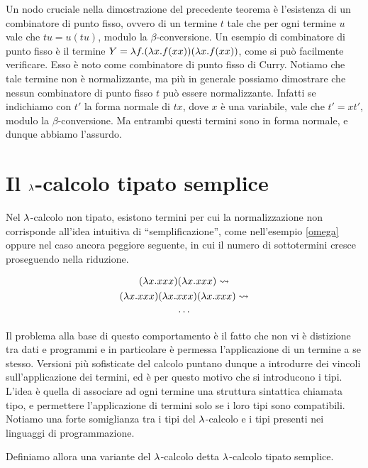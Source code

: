 \documentclass[]{marticle}
\begin{document}
Un nodo cruciale nella dimostrazione del precedente teorema \`e l'esistenza di
un combinatore di punto fisso, ovvero di un termine $t$ tale che per ogni
termine $u$ vale che $tu = u(tu)$, modulo la $\beta$-conversione. Un esempio di
combinatore di punto fisso \`e il termine $Y = \lambda f. (\lambda x. f(xx))(\lambda x.
f(xx))$, come si pu\`o facilmente verificare. Esso \`e noto come combinatore di
punto fisso di Curry. Notiamo che tale termine non \`e normalizzante, ma pi\`u
in generale possiamo dimostrare che nessun combinatore di punto fisso $t$ pu\`o
essere normalizzante.  Infatti se indichiamo con $t'$ la forma normale di $tx$,
dove $x$ \`e una variabile, vale che $t' = xt'$, modulo la $\beta$-conversione.
Ma entrambi questi termini sono in forma normale, e dunque abbiamo l'assurdo.

\section{Il $\lambda$-calcolo tipato semplice}

Nel $\lambda$-calcolo non tipato, esistono termini per cui la normalizzazione non
corrisponde all'idea intuitiva di ``semplificazione'', come nell'esempio
\ref{omega} oppure nel caso ancora peggiore seguente, in cui il numero di
sottotermini cresce proseguendo nella riduzione.

\begin{block}[Esempio]
    \begin{gather*}
        (\lambda x. xxx)(\lambda x. xxx) \rightsquigarrow \\
        (\lambda x. xxx)(\lambda x. xxx)(\lambda x. xxx)\rightsquigarrow \\
        \cdots
    \end{gather*}
\end{block} 

Il problema alla base di questo comportamento \`e il fatto che non vi \`e
distizione tra dati e programmi e in particolare \`e permessa l'applicazione di
un termine a se stesso. Versioni pi\`u sofisticate del calcolo puntano dunque a
introdurre dei vincoli sull'applicazione dei termini, ed \`e per questo motivo
che si introducono i tipi. L'idea \`e quella di associare ad ogni termine una
struttura sintattica chiamata tipo, e permettere l'applicazione di termini solo
se i loro tipi sono compatibili. Notiamo una forte somiglianza tra i tipi del
$\lambda$-calcolo e i tipi presenti nei linguaggi di programmazione.

Definiamo allora una variante del $\lambda$-calcolo detta $\lambda$-calcolo tipato
semplice.
\end{document}
